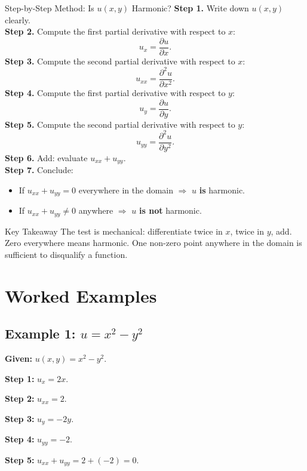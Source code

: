 \documentclass[12pt,a4paper]{article}
\begin{document}
\begin{infobox}{Step-by-Step Method: Is $u(x,y)$ Harmonic?}
\textbf{Step 1.} Write down $u(x,y)$ clearly.\\[4pt]
\textbf{Step 2.} Compute the first partial derivative with respect to $x$:
\[
  u_{x} = \frac{\partial u}{\partial x}.
\]
\textbf{Step 3.} Compute the second partial derivative with respect to $x$:
\[
  u_{xx} = \frac{\partial^{2} u}{\partial x^{2}}.
\]
\textbf{Step 4.} Compute the first partial derivative with respect to $y$:
\[
  u_{y} = \frac{\partial u}{\partial y}.
\]
\textbf{Step 5.} Compute the second partial derivative with respect to $y$:
\[
  u_{yy} = \frac{\partial^{2} u}{\partial y^{2}}.
\]
\textbf{Step 6.} Add: evaluate $u_{xx}+u_{yy}$.\\[4pt]
\textbf{Step 7.} Conclude:
\begin{itemize}
  \item If $u_{xx}+u_{yy}=0$ everywhere in the domain $\Rightarrow$ $u$ \textbf{is} harmonic.
  \item If $u_{xx}+u_{yy}\neq 0$ anywhere $\Rightarrow$ $u$ \textbf{is not} harmonic.
\end{itemize}
\end{infobox}

\begin{learnbox}{Key Takeaway}
The test is mechanical: differentiate twice in $x$, twice in $y$, add. Zero everywhere means
harmonic. One non-zero point anywhere in the domain is sufficient to disqualify a function.
\end{learnbox}

\section{Worked Examples}

\subsection*{Example 1: $u = x^{2}-y^{2}$}

\textbf{Given:} $u(x,y)=x^{2}-y^{2}$.

\textbf{Step 1:} $u_{x} = 2x$.

\textbf{Step 2:} $u_{xx} = 2$.

\textbf{Step 3:} $u_{y} = -2y$.

\textbf{Step 4:} $u_{yy} = -2$.

\textbf{Step 5:} $u_{xx}+u_{yy} = 2+(-2) = 0$.
\end{document}
